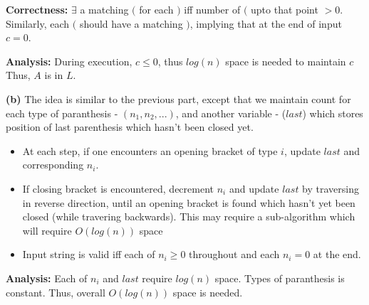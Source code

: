 \documentclass[11pt]{article}
\renewcommand\part[1]{\vspace{.10in}\textbf{(#1)}}
\newcommand\correctness{\vspace{.05in}\textbf{Correctness: }}
\newcommand\anlys{\vspace{.05in}\textbf{Analysis: }}
\begin{document}
\correctness $\exists$ a matching $($ for each $)$ iff number of $($ upto that point $>0$.
Similarly, each $($ should have a matching $)$, implying that at the end of input $c=0$.

\anlys During execution, $c \leq 0$, thus $log(n)$ space is needed to maintain $c$\\
\vspace{0.1in}
Thus, $A$ is in $L$.

\part{b} 
The idea is similar to the previous part, except that we maintain count for each 
type of paranthesis - $({n_1},{n_2}, ...)$, and another variable - ($last$) which stores position of last parenthesis which hasn't been closed yet.\\
\vspace{-0.15in}
\begin{itemize}
\item At each step, if one encounters an opening bracket of type $i$, update $last$ and corresponding $n_i$.\\
\item If closing bracket is encountered, decrement $n_i$ and update $last$ by traversing in reverse
direction, 
until an opening bracket is found which hasn't yet been closed (while travering backwards). This may require a sub-algorithm which will require $O(log(n))$ space
\item Input string is valid iff each of $n_{i} \geq 0$ throughout and each $n_{i} = 0$ at the end.
\end{itemize}

\anlys Each of $n_i$ and $last$ require $log(n)$ space. Types of paranthesis is constant. 
Thus, overall $O(log(n))$ space is needed.
 
\end{document}
